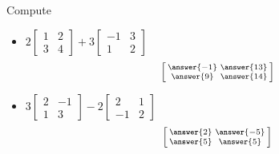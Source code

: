 \documentclass{ximera}
\begin{document}
\begin{exercise}%
    Compute
    \begin{itemize}
        \item
        $2\begin{bmatrix}
            1 & 2 \\
            3 & 4
        \end{bmatrix}
        + 3
        \begin{bmatrix}
            -1 & 3 \\
            1 & 2
        \end{bmatrix}$
        \[
            \left[\begin{smallmatrix} \answer{-1} & \answer{13} \\ \answer{9} & \answer{14} \end{smallmatrix}\right]
        \]
        \item
        $3\begin{bmatrix}
            2 & -1 \\
            1 & 3
        \end{bmatrix}
        - 2
        \begin{bmatrix}
            2 & 1 \\
            -1 & 2
        \end{bmatrix}$
        \[
            \left[\begin{smallmatrix} \answer{2} & \answer{-5} \\ \answer{5} & \answer{5} \end{smallmatrix}\right]
        \]
    \end{itemize}
\end{exercise}
\end{document}
